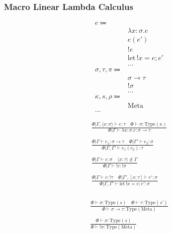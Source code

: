 \documentclass {article}
\begin{document}
\subsubsection{Macro Linear Lambda Calculus}
\begin{align*}
e \Coloneqq & \\
& \lambda x : \sigma. e \tag{Macro Lambda}\\
& e(e') \tag{Macro Application}\\
& !e \tag{Bang Introduction} \\
& \text{let} \, !x = e; e' \tag{Bang Elimination} \\
& \dots \\
\sigma, \tau, \pi \Coloneqq & \\
& \sigma \to \tau \tag{Macro} \\
& !\sigma \tag{Bang} \\
& \dots \\
\kappa, s, \rho \Coloneqq & \\
& \text{Meta} \tag{Meta Stage} \\
\dots
\end{align*}

\begin{gather*}
\frac
{\Phi | \Gamma, \langle x : \sigma \rangle \vdash e : \tau \quad \Phi \vdash \sigma : \text{Type} (\kappa)}
{\Phi | \Gamma \vdash \lambda x:\sigma. e : \sigma \to \tau } \\
\\
\frac
{\Phi | \Gamma \vdash e_1 : \sigma \to \tau \quad \Phi | \Gamma' \vdash e_2 : \sigma}
{\Phi | \Gamma, \Gamma' \vdash e_1(e_2) : \tau} \\
\\
\frac
{\Phi | \Gamma \vdash e : \sigma \quad \langle x : \tau \rangle \notin \Gamma }
{\Phi | \Gamma \vdash !e : !\sigma } \\
\\
\frac
{\Phi | \Gamma \vdash e : !\tau \quad \Phi | \Gamma', [x : \tau] \vdash e' : \sigma }
{\Phi | \Gamma, \Gamma' \vdash \text{let} \, !x = e; e' : \sigma}  \\
\end{gather*}

\begin{gather*}
\frac
{\Phi \vdash \sigma : \text{Type} (s) \quad \Phi \vdash \tau : \text{Type} (s')}
{\Phi \vdash \sigma \to \tau : \text{Type} (\text{Meta})} \\
\\
\frac
{\Phi \vdash \sigma : \text{Type} (s)}
{\Phi \vdash !\sigma : \text{Type} (\text{Meta})} \\
\end{gather*}
\end{document}

